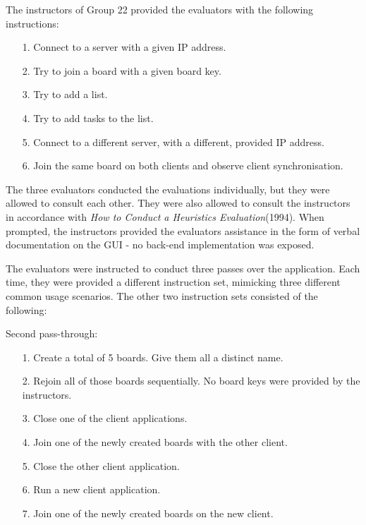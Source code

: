 The instructors of Group 22 provided the evaluators with the following instructions:
\begin{itemize}
    \item [1.] Connect to a server with a given IP address.
    \item [2.] Try to join a board with a given board key.
    \item [3.] Try to add a list.
    \item [4.] Try to add tasks to the list.
    \item [5.] Connect to a different server, with a different, provided IP address.
    \item [6.] Join the same board on both clients and observe client synchronisation.
\end{itemize}

The three evaluators conducted the evaluations individually, but they were allowed to consult each other. They were also allowed to consult the instructors in accordance with \emph{How to Conduct a Heuristics Evaluation}(1994). When prompted, the instructors provided the evaluators assistance in the form of verbal documentation on the GUI - no back-end implementation was exposed. 

The evaluators were instructed to conduct three passes over the application. Each time, they were provided a different instruction set, mimicking three different common usage scenarios. The other two instruction sets consisted of the following:

Second pass-through:
\begin{itemize}
    \item [1.] Create a total of 5 boards. Give them all a distinct name.
    \item [2.] Rejoin all of those boards sequentially. No board keys were provided by the instructors.
    \item [3.] Close one of the client applications. 
    \item [4.] Join one of the newly created boards with the other client.
    \item [5.] Close the other client application.
    \item [6.] Run a new client application. 
    \item [7.] Join one of the newly created boards on the new client.
\end{itemize}


